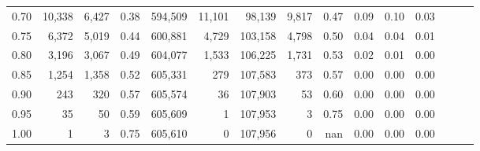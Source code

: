 \begin{tabular}{rrrrrrrrrrrrrrr}
0.70 &   10,338 &   6,427 &  0.38 &  594,509 &   11,101 &   98,139 &    9,817 &  0.47 &  0.09 &  0.10 &      0.03 \\
0.75 &    6,372 &   5,019 &  0.44 &  600,881 &    4,729 &  103,158 &    4,798 &  0.50 &  0.04 &  0.04 &      0.01 \\
0.80 &    3,196 &   3,067 &  0.49 &  604,077 &    1,533 &  106,225 &    1,731 &  0.53 &  0.02 &  0.01 &      0.00 \\
0.85 &    1,254 &   1,358 &  0.52 &  605,331 &      279 &  107,583 &      373 &  0.57 &  0.00 &  0.00 &      0.00 \\
0.90 &      243 &     320 &  0.57 &  605,574 &       36 &  107,903 &       53 &  0.60 &  0.00 &  0.00 &      0.00 \\
0.95 &       35 &      50 &  0.59 &  605,609 &        1 &  107,953 &        3 &  0.75 &  0.00 &  0.00 &      0.00 \\
1.00 &        1 &       3 &  0.75 &  605,610 &        0 &  107,956 &        0 &   nan &  0.00 &  0.00 &      0.00 \\
\bottomrule
\end{tabular}

